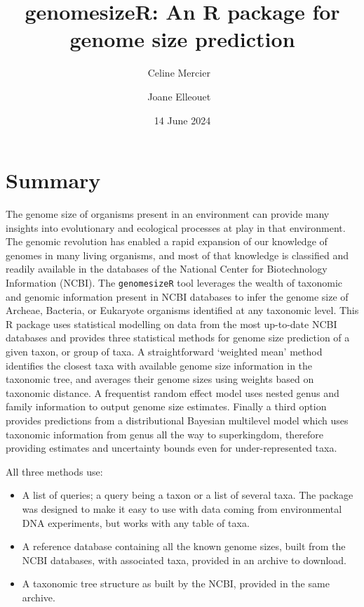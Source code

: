 \documentclass[
]{article}
\title{genomesizeR: An R package for genome size prediction}
\author[1%
  *%
  ]{Celine Mercier%
    \,\orcidlink{0000-0002-4782-1530}\,%
    }
\author[1%
  *%
  ]{Joane Elleouet%
    \,\orcidlink{0000-0002-9597-3360}\,%
    }
\affil[1]{Scion, New Zealand Forest Research Institute, New Zealand}
\affil[*]{These authors contributed equally.}
\date{14 June 2024}
\providecommand{\tightlist}{%
  \setlength{\itemsep}{0pt}\setlength{\parskip}{0pt}}
\begin{document}
\maketitle

\section{Summary}\label{summary}

The genome size of organisms present in an environment can provide many
insights into evolutionary and ecological processes at play in that
environment. The genomic revolution has enabled a rapid expansion of our
knowledge of genomes in many living organisms, and most of that
knowledge is classified and readily available in the databases of the
National Center for Biotechnology Information (NCBI). The
\texttt{genomesizeR} tool leverages the wealth of taxonomic and genomic
information present in NCBI databases to infer the genome size of
Archeae, Bacteria, or Eukaryote organisms identified at any taxonomic
level. This R package uses statistical modelling on data from the most
up-to-date NCBI databases and provides three statistical methods for
genome size prediction of a given taxon, or group of taxa. A
straightforward `weighted mean' method identifies the closest taxa with
available genome size information in the taxonomic tree, and averages
their genome sizes using weights based on taxonomic distance. A
frequentist random effect model uses nested genus and family information
to output genome size estimates. Finally a third option provides
predictions from a distributional Bayesian multilevel model which uses
taxonomic information from genus all the way to superkingdom, therefore
providing estimates and uncertainty bounds even for under-represented
taxa.

All three methods use:

\begin{itemize}
\tightlist
\item
  A list of queries; a query being a taxon or a list of several taxa.
  The package was designed to make it easy to use with data coming from
  environmental DNA experiments, but works with any table of taxa.
\item
  A reference database containing all the known genome sizes, built from
  the NCBI databases, with associated taxa, provided in an archive to
  download.
\item
  A taxonomic tree structure as built by the NCBI, provided in the same
  archive.
\end{itemize}
\end{document}
